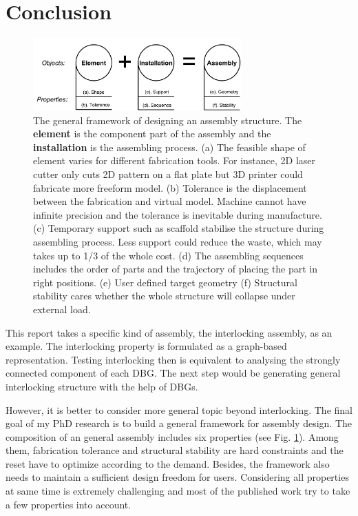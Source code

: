 
\section{Conclusion}
\label{sec:conclusion}
\begin{figure}[!t]
	\centering
	\includegraphics[width=8.00cm]{images/general_assembly.png}
	\vspace*{-2.5mm}
	\caption{The general framework of designing an assembly structure. The {\bf element} is the component part of the assembly and the {\bf installation} is the assembling process. (a) The feasible shape of element varies for different fabrication tools. For instance, 2D laser cutter only cuts 2D pattern on a flat plate but 3D printer could fabricate more freeform model. (b) Tolerance is the displacement between the fabrication and virtual model.  Machine cannot have infinite precision and the tolerance is inevitable during manufacture. (c) Temporary support such as scaffold stabilise the structure during assembling process. Less support could reduce the waste, which may takes up to 1/3 of the whole cost. (d) The assembling sequences includes the order of parts and the trajectory of placing the part in right positions. (e) User defined target geometry (f) Structural stability cares whether the whole structure will collapse under external load.
	}
	\vspace*{-4.0mm}
	\label{fig:general_assembly}
\end{figure}

This report takes a specific kind of assembly, the interlocking assembly, as an example. The interlocking property is formulated as a graph-based representation. Testing interlocking then is equivalent to analysing the strongly connected component of each DBG. The next step would be generating general interlocking structure with the help of DBGs.

However, it is better to consider more general topic beyond interlocking. The final goal of my PhD research is to build a general framework for assembly design. The composition of an general assembly includes six properties (see Fig. \ref{fig:general_assembly}). Among them, fabrication tolerance and structural stability are hard constraints and the reset have to optimize according to the demand. Besides, the framework also needs to maintain a sufficient design freedom for users. Considering all properties at same time is extremely challenging and most of the published work try to take a few properties into account. 

